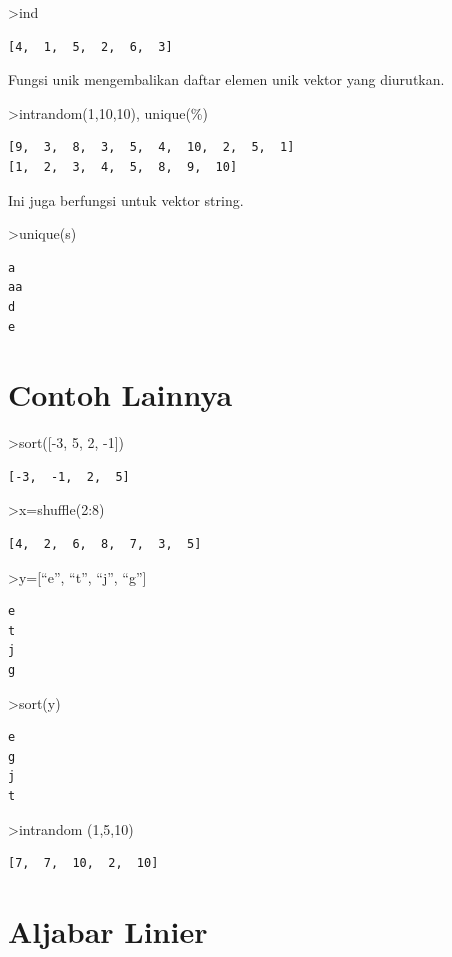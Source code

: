 \documentclass[
]{book}
\begin{document}
\textgreater ind

\begin{verbatim}
[4,  1,  5,  2,  6,  3]
\end{verbatim}

Fungsi unik mengembalikan daftar elemen unik vektor yang diurutkan.

\textgreater intrandom(1,10,10), unique(\%)

\begin{verbatim}
[9,  3,  8,  3,  5,  4,  10,  2,  5,  1]
[1,  2,  3,  4,  5,  8,  9,  10]
\end{verbatim}

Ini juga berfungsi untuk vektor string.

\textgreater unique(s)

\begin{verbatim}
a
aa
d
e
\end{verbatim}

\chapter{Contoh Lainnya}\label{contoh-lainnya-14}

\textgreater sort({[}-3, 5, 2, -1{]})

\begin{verbatim}
[-3,  -1,  2,  5]
\end{verbatim}

\textgreater x=shuffle(2:8)

\begin{verbatim}
[4,  2,  6,  8,  7,  3,  5]
\end{verbatim}

\textgreater y={[}``e'', ``t'', ``j'', ``g''{]}

\begin{verbatim}
e
t
j
g
\end{verbatim}

\textgreater sort(y)

\begin{verbatim}
e
g
j
t
\end{verbatim}

\textgreater intrandom (1,5,10)

\begin{verbatim}
[7,  7,  10,  2,  10]
\end{verbatim}

\chapter{Aljabar Linier}\label{aljabar-linier}
\end{document}
